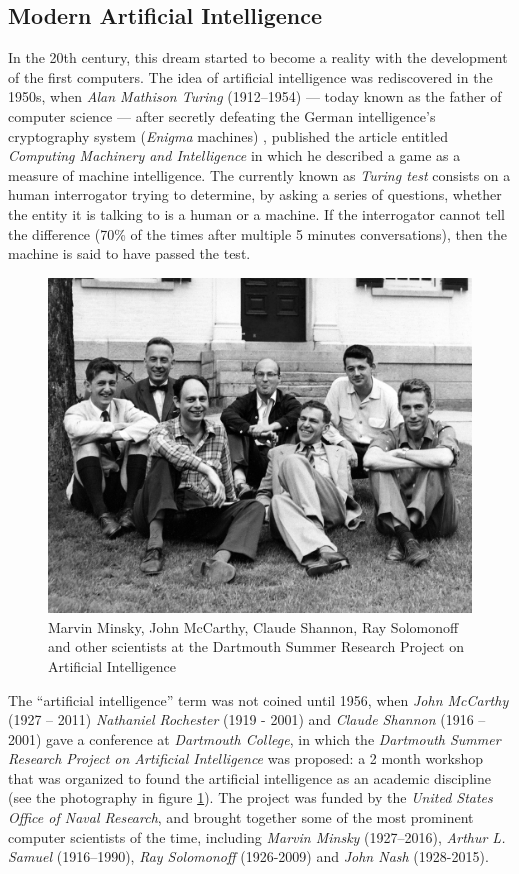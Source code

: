 \subsection{Modern Artificial Intelligence}
In the 20th century, this dream started to become a reality with the development of the first computers. The idea of artificial intelligence was rediscovered in the 1950s, when \textit{Alan Mathison Turing} (1912–1954) — today known as the father of computer science — after secretly defeating the German intelligence's cryptography system (\textit{Enigma} machines) \cite{Hodges:2000}, published the article entitled \textit{Computing Machinery and Intelligence} \cite{turing1950} in which he described a game as a measure of machine intelligence. The currently known as \textit{Turing test} consists on a human interrogator trying to determine, by asking a series of questions, whether the entity it is talking to is a human or a machine. If the interrogator cannot tell the difference (70\% of the times after multiple 5 minutes conversations), then the machine is said to have passed the test.

\begin{figure}
	\centering
	\includegraphics[width=.6\textwidth]{chapter1/images/dartmouth}
	\caption{Marvin Minsky, John McCarthy, Claude Shannon, Ray Solomonoff and other scientists at the Dartmouth Summer Research Project on Artificial Intelligence}
	\label{fig:dartmouth_photo}
\end{figure}

The ``artificial intelligence'' term was not coined until 1956, when \textit{John McCarthy} (1927 – 2011) \textit{Nathaniel Rochester} (1919 - 2001) and \textit{Claude Shannon} (1916 – 2001) gave a conference at \textit{Dartmouth College}, in which the \textit{Dartmouth Summer Research Project on Artificial Intelligence} was proposed: a 2 month workshop that was organized to found the artificial intelligence as an academic discipline (see the photography in figure \ref{fig:dartmouth_photo}). The project was funded by the \textit{United States Office of Naval Research}, and brought together some of the most prominent computer scientists of the time, including \textit{Marvin Minsky} (1927–2016), \textit{Arthur L. Samuel} (1916–1990), \textit{Ray Solomonoff} (1926-2009) and \textit{John Nash} (1928-2015).

